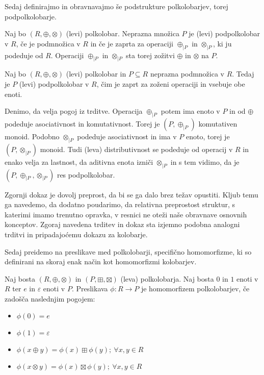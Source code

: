 \documentclass[mat1]{fmfdelo}
\newcommand{\map}[3]{\ensuremath{{#1}:{#2}\rightarrow{#3}}}
\begin{document}
Sedaj definirajmo in obravnavajmo še podstrukture polkolobarjev, torej podpolkolobarje.

\begin{definicija}
	Naj bo $(R, \oplus, \otimes)$ (levi) polkolobar. Neprazna množica $P$ je (levi) podpolkolobar v $R$, če je podmnožica v $R$ in če je zaprta za operaciji $\oplus_{|P}$ in $\otimes_{|P}$, ki ju podeduje od $R$. Operaciji $\oplus_{|P}$ in $\otimes_{|P}$ sta torej zožitvi $\oplus$ in $\otimes$ na $P$.
\end{definicija}

\begin{trditev}
	Naj bo $(R, \oplus, \otimes)$ (levi) polkolobar in $P\subseteq R$ neprazna podmnožica v $R$. Tedaj je $P$ (levi) podpolkolobar v $R$, čim je zaprt za zoženi operaciji in vsebuje obe enoti.
\end{trditev}
\begin{dokaz}
	Denimo, da velja pogoj iz trditve. Operacija $\oplus_{|P}$ potem ima enoto v $P$ in od $\oplus$ podeduje asociativnost in komutativnost. Torej je $(P, \oplus_{|P})$ komutativen monoid. Podobno $\otimes_{|P}$ podeduje asociativnost in ima v $P$ enoto, torej je $(P, \otimes_{|P})$ monoid.
	Tudi (leva) distributivnost se podeduje od operacij v $R$ in enako velja za lastnost, da aditivna enota izniči $\otimes_{|P}$ in s tem vidimo, da je $(P, \oplus_{|P}, \otimes_{|P})$ res podpolkolobar.
\end{dokaz}

Zgornji dokaz je dovolj preprost, da bi se ga dalo brez težav opustiti. Kljub temu ga navedemo, da dodatno poudarimo, da relativna preprostost struktur, s katerimi imamo trenutno opravka, v resnici ne oteži naše obravnave osnovnih konceptov. Zgoraj navedena trditev in dokaz sta izjemno podobna analogni trditvi in pripadajoćemu dokazu za kolobarje.
	
Sedaj preidemo na preslikave med polkolobarji, specifično homomorfizme, ki so definirani na skoraj enak način kot homomorfizmi kolobarjev.
	
\begin{definicija}
	Naj bosta $(R, \oplus, \otimes)$ in $(P, \boxplus, \boxtimes)$ (leva) polkolobarja. Naj bosta $0$ in $1$ enoti v $R$ ter $e$ in $\varepsilon$ enoti v $P$. Preslikava $\map{\phi}{R}{P}$ je homomorfizem polkolobarjev, če zadošča naslednjim pogojem:
	\begin{itemize}
		\item $\phi(0) = e$
		\item $\phi(1) = \varepsilon$
		\item $\phi(x \oplus y) = \phi(x) \boxplus\phi(y) ;~\forall x, y\in R$
		\item $\phi(x \otimes y) = \phi(x) \boxtimes\phi(y) ;~\forall x, y\in R$
	\end{itemize}
\end{definicija}
\end{document}
